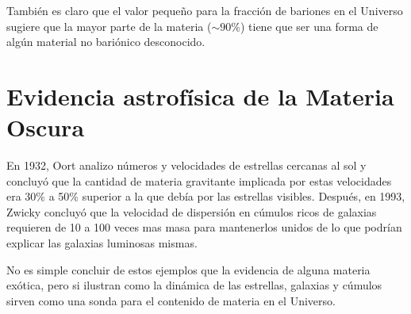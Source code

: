 También es claro que el valor pequeño para la fracción de bariones en el Universo sugiere que la mayor parte de la materia ($\sim 90\%$) tiene que ser una forma de algún material no bariónico desconocido.


\section{Evidencia astrofísica de la Materia Oscura}
En 1932, Oort analizo números y velocidades de estrellas cercanas al sol y concluyó que la cantidad de materia gravitante implicada por estas velocidades era 30\% a 50\% superior a la que debía por las estrellas visibles. Después, en 1993, Zwicky concluyó que la velocidad de dispersión en cúmulos ricos de galaxias requieren de 10 a 100 veces mas masa para mantenerlos unidos de lo que podrían explicar las galaxias luminosas mismas.

No es simple concluir de estos ejemplos que la evidencia de alguna materia exótica, pero si ilustran como la dinámica de las estrellas, galaxias y cúmulos sirven como una sonda para el contenido de materia en el Universo.



